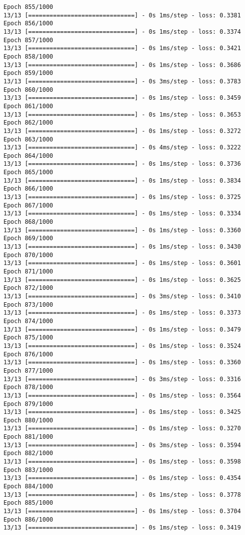 \documentclass[11pt]{article}
\begin{document}
\begin{Verbatim}[commandchars=\\\{\}]
Epoch 855/1000
13/13 [==============================] - 0s 1ms/step - loss: 0.3381
Epoch 856/1000
13/13 [==============================] - 0s 1ms/step - loss: 0.3374
Epoch 857/1000
13/13 [==============================] - 0s 1ms/step - loss: 0.3421
Epoch 858/1000
13/13 [==============================] - 0s 1ms/step - loss: 0.3686
Epoch 859/1000
13/13 [==============================] - 0s 3ms/step - loss: 0.3783
Epoch 860/1000
13/13 [==============================] - 0s 1ms/step - loss: 0.3459
Epoch 861/1000
13/13 [==============================] - 0s 1ms/step - loss: 0.3653
Epoch 862/1000
13/13 [==============================] - 0s 1ms/step - loss: 0.3272
Epoch 863/1000
13/13 [==============================] - 0s 4ms/step - loss: 0.3222
Epoch 864/1000
13/13 [==============================] - 0s 1ms/step - loss: 0.3736
Epoch 865/1000
13/13 [==============================] - 0s 1ms/step - loss: 0.3834
Epoch 866/1000
13/13 [==============================] - 0s 1ms/step - loss: 0.3725
Epoch 867/1000
13/13 [==============================] - 0s 1ms/step - loss: 0.3334
Epoch 868/1000
13/13 [==============================] - 0s 1ms/step - loss: 0.3360
Epoch 869/1000
13/13 [==============================] - 0s 1ms/step - loss: 0.3430
Epoch 870/1000
13/13 [==============================] - 0s 1ms/step - loss: 0.3601
Epoch 871/1000
13/13 [==============================] - 0s 1ms/step - loss: 0.3625
Epoch 872/1000
13/13 [==============================] - 0s 3ms/step - loss: 0.3410
Epoch 873/1000
13/13 [==============================] - 0s 1ms/step - loss: 0.3373
Epoch 874/1000
13/13 [==============================] - 0s 1ms/step - loss: 0.3479
Epoch 875/1000
13/13 [==============================] - 0s 1ms/step - loss: 0.3524
Epoch 876/1000
13/13 [==============================] - 0s 1ms/step - loss: 0.3360
Epoch 877/1000
13/13 [==============================] - 0s 3ms/step - loss: 0.3316
Epoch 878/1000
13/13 [==============================] - 0s 1ms/step - loss: 0.3564
Epoch 879/1000
13/13 [==============================] - 0s 1ms/step - loss: 0.3425
Epoch 880/1000
13/13 [==============================] - 0s 1ms/step - loss: 0.3270
Epoch 881/1000
13/13 [==============================] - 0s 3ms/step - loss: 0.3594
Epoch 882/1000
13/13 [==============================] - 0s 1ms/step - loss: 0.3598
Epoch 883/1000
13/13 [==============================] - 0s 1ms/step - loss: 0.4354
Epoch 884/1000
13/13 [==============================] - 0s 1ms/step - loss: 0.3778
Epoch 885/1000
13/13 [==============================] - 0s 1ms/step - loss: 0.3704
Epoch 886/1000
13/13 [==============================] - 0s 1ms/step - loss: 0.3419

\end{Verbatim}
\end{document}
